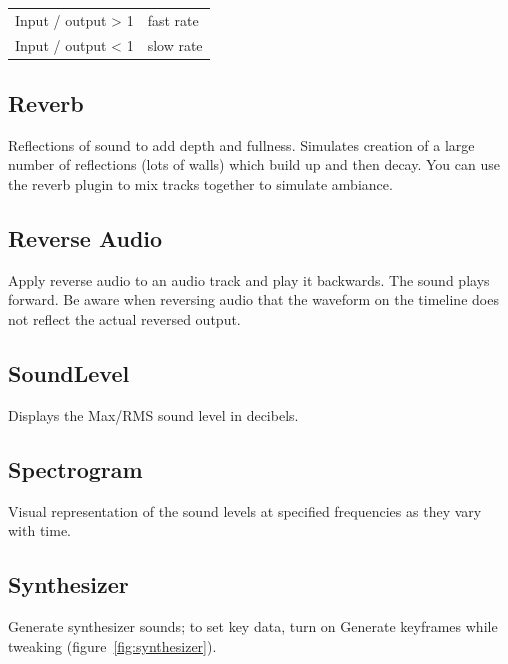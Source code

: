 \begin{center}
    \begin{tabular}{l l}
        \toprule
        Input / output > 1 &	fast rate \\
        Input / output < 1 &	slow rate \\        
        \bottomrule
    \end{tabular}
\end{center}

\subsection{Reverb}%
\label{sub:reverb}

Reflections of sound to add depth and fullness. Simulates creation of a large number of reflections (lots of walls) which build up and then decay. You can use the reverb plugin to mix tracks together to simulate ambiance.

\subsection{Reverse Audio}%
\label{sub:reverse_audio}

Apply reverse audio to an audio track and play it backwards. The sound plays forward. Be aware when reversing audio that the waveform on the timeline does not reflect the actual reversed output.

\subsection{SoundLevel}%
\label{sub:soundlevel}

Displays the Max/RMS sound level in decibels.

\subsection{Spectrogram}%
\label{sub:Spectrogram}

Visual representation of the sound levels at specified frequencies as they vary with time.

\subsection{Synthesizer}%
\label{sub:Synthesizer}

Generate synthesizer sounds; to set key data, turn on Generate keyframes while tweaking (figure~\ref{fig:synthesizer}).

